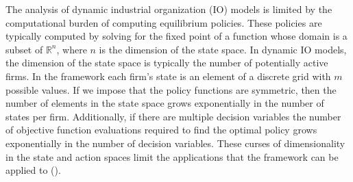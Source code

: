\documentclass[12pt]{article}
\begin{document}


The analysis of dynamic industrial organization (IO) models is limited by the computational burden of computing equilibrium policies. These policies are typically computed by solving for the fixed point of a function whose domain is a subset of $\mathbb{R}^n$, where $n$ is the dimension of the state space. In dynamic IO models, the dimension of the state space is typically the number of potentially active firms. In the \citet{1995_Erickson_Pakes_RES} framework each firm's state is an element of a discrete grid with $m$ possible values. If we impose that the policy functions are symmetric, then the number of elements in the state space grows exponentially in the number of states per firm. Additionally, if there are multiple decision variables the number of objective function evaluations required to find the optimal policy grows exponentially in the number of decision variables. These curses of dimensionality in the state and action spaces limit the applications that the \citet{1995_Erickson_Pakes_RES} framework can be applied to (\cite{2008_Weintraub_Benkard_VanRoy_Econometrica, 2001_Pakes_McGuire_RAND, 2007_Doraszelski_Judd, 2011_Aguirregabiria_Nevo_working}).
\end{document}
